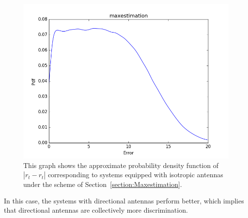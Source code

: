 	\begin{figure}[]
		\centering
		\includegraphics[scale=0.5]{Figures/maxomniex.png}
		\caption{This graph shows the approximate probability density function of $|r_{t}-\hat{r_{t}}|$ corresponding to systems equipped with isotropic antennas under the scheme of Section~\ref{section:Maxestimation}. }
		\label{figure: maxomniex}
	\end{figure}
In this case, the systems with directional antennas perform better, which implies that directional antennas are collectively more discrimination.

